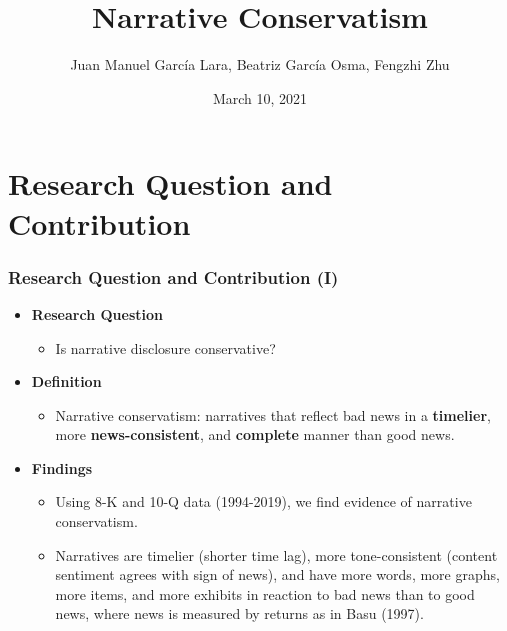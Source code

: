 \documentclass{beamer}
\title[Narrative Conservatism]{Narrative Conservatism} %
\author[]{Juan Manuel Garc\'ia Lara, Beatriz Garc\'ia Osma, Fengzhi Zhu} %
\institute[García Lara, Garcia Osma, \& Zhu, 2021] %
{Universidad Carlos III de Madrid \\ %

	\medskip
	\textit{bgosma@emp.uc3m.es}
	\medskip
		\\

\large The University of Manchester

	\medskip} %
\date{March 10, 2021} %
\begin{document}
	
\begin{frame}
\titlepage %
\end{frame}


\section{Research Question and Contribution}

\begin{frame}
\frametitle{Research Question and Contribution (I)}
\begin{itemize}
\item \textbf{Research Question}

\begin{itemize}
\item Is narrative disclosure conservative? \pause
\end{itemize}

\item \textbf{Definition}

\begin{itemize}
	\item Narrative conservatism: narratives that reflect bad news in a \textbf{timelier}, more \textbf{news-consistent}, and \textbf{complete} manner than good news. \pause
\end{itemize}

\item \textbf{Findings}

\begin{itemize}
	\item Using 8-K and 10-Q data (1994-2019), we find evidence of narrative conservatism.
	\item 	Narratives are timelier (shorter time lag), more tone-consistent (content sentiment agrees with sign of news), and have more words, more graphs, more items, and more exhibits in reaction	to bad news than to good news, where news is measured by returns as in Basu (1997).
\end{itemize}
\end{itemize}
\end{frame}
\end{document}

